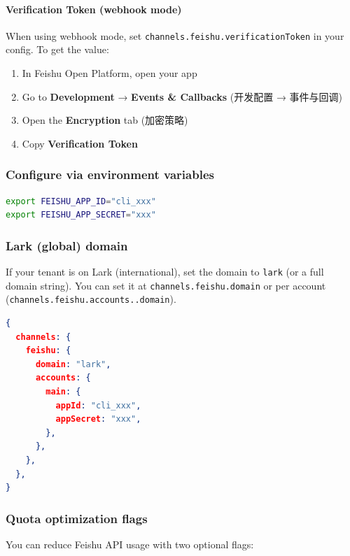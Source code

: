 \paragraph{Verification Token (webhook mode)}


When using webhook mode, set \texttt{channels.feishu.verificationToken} in your config. To get the value:

\begin{enumerate}
  \item In Feishu Open Platform, open your app
  \item Go to \textbf{Development} → \textbf{Events \& Callbacks} (开发配置 → 事件与回调)
  \item Open the \textbf{Encryption} tab (加密策略)
  \item Copy \textbf{Verification Token}
\end{enumerate}



\subsubsection{Configure via environment variables}


\begin{lstlisting}[language=bash]
export FEISHU_APP_ID="cli_xxx"
export FEISHU_APP_SECRET="xxx"
\end{lstlisting}


\subsubsection{Lark (global) domain}


If your tenant is on Lark (international), set the domain to \texttt{lark} (or a full domain string). You can set it at \texttt{channels.feishu.domain} or per account (\texttt{channels.feishu.accounts..domain}).

\begin{lstlisting}[language=json]
{
  channels: {
    feishu: {
      domain: "lark",
      accounts: {
        main: {
          appId: "cli_xxx",
          appSecret: "xxx",
        },
      },
    },
  },
}
\end{lstlisting}


\subsubsection{Quota optimization flags}


You can reduce Feishu API usage with two optional flags:

